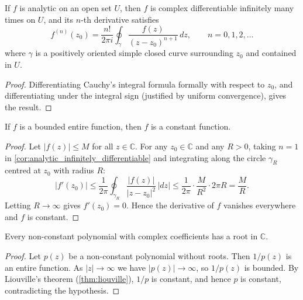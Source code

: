 \begin{corollary}\label{cor:analytic_infinitely_differentiable}
If $f$ is analytic on an open set $U$, then $f$ is complex differentiable infinitely many times on $U$, and its $n$-th derivative satisfies
\[
f^{(n)}(z_0) = \frac{n!}{2\pi i} \oint_\gamma \frac{f(z)}{(z - z_0)^{n+1}}\,dz, \qquad n = 0, 1, 2, \dots
\]
where $\gamma$ is a positively oriented simple closed curve surrounding $z_0$ and contained in $U$.
\end{corollary}

\begin{proof}
Differentiating Cauchy's integral formula formally with respect to $z_0$, and differentiating under the integral sign (justified by uniform convergence), gives the result.
\end{proof}

\begin{theorem}\label{thm:liouville}
If $f$ is a bounded entire function, then $f$ is a constant function.
\end{theorem}

\begin{proof}
Let $|f(z)| \le M$ for all $z \in \mathbb{C}$. For any $z_0 \in \mathbb{C}$ and any $R > 0$, taking $n = 1$ in \cref{cor:analytic_infinitely_differentiable} and integrating along the circle $\gamma_R$ centred at $z_0$ with radius $R$:
\[
|f'(z_0)| \le \frac{1}{2\pi} \oint_{\gamma_R} \frac{|f(z)|}{|z-z_0|^2}\,|dz| \le \frac{1}{2\pi} \cdot \frac{M}{R^2} \cdot 2\pi R = \frac{M}{R}.
\]
Letting $R \to \infty$ gives $f'(z_0) = 0$. Hence the derivative of $f$ vanishes everywhere and $f$ is constant.
\end{proof}

\begin{corollary}\label{cor:fundamental_theorem_algebra}
Every non-constant polynomial with complex coefficients has a root in $\mathbb{C}$.
\end{corollary}

\begin{proof}
Let $p(z)$ be a non-constant polynomial without roots. Then $1/p(z)$ is an entire function. As $|z| \to \infty$ we have $|p(z)| \to \infty$, so $1/p(z)$ is bounded. By Liouville's theorem (\cref{thm:liouville}), $1/p$ is constant, and hence $p$ is constant, contradicting the hypothesis.
\end{proof}


